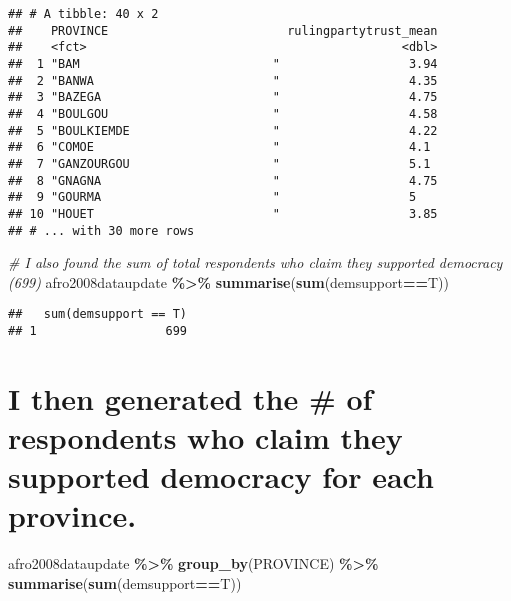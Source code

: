 \documentclass[]{article}
\newenvironment{Shaded}{\begin{snugshade}}{\end{snugshade}}
\newcommand{\CommentTok}[1]{\textcolor[rgb]{0.56,0.35,0.01}{\textit{#1}}}
\newcommand{\KeywordTok}[1]{\textcolor[rgb]{0.13,0.29,0.53}{\textbf{#1}}}
\newcommand{\NormalTok}[1]{#1}
\newcommand{\OperatorTok}[1]{\textcolor[rgb]{0.81,0.36,0.00}{\textbf{#1}}}
\newcommand{\StringTok}[1]{\textcolor[rgb]{0.31,0.60,0.02}{#1}}
\begin{document}
\begin{verbatim}
## # A tibble: 40 x 2
##    PROVINCE                         rulingpartytrust_mean
##    <fct>                                            <dbl>
##  1 "BAM                           "                  3.94
##  2 "BANWA                         "                  4.35
##  3 "BAZEGA                        "                  4.75
##  4 "BOULGOU                       "                  4.58
##  5 "BOULKIEMDE                    "                  4.22
##  6 "COMOE                         "                  4.1 
##  7 "GANZOURGOU                    "                  5.1 
##  8 "GNAGNA                        "                  4.75
##  9 "GOURMA                        "                  5   
## 10 "HOUET                         "                  3.85
## # ... with 30 more rows
\end{verbatim}

\begin{Shaded}
\begin{Highlighting}[]
\CommentTok{\# I also found the sum of total respondents who claim they supported democracy (699)}
\NormalTok{afro2008dataupdate }\OperatorTok{\%>\%}
\StringTok{  }\KeywordTok{summarise}\NormalTok{(}\KeywordTok{sum}\NormalTok{(demsupport}\OperatorTok{==}\NormalTok{T))}
\end{Highlighting}
\end{Shaded}

\begin{verbatim}
##   sum(demsupport == T)
## 1                  699
\end{verbatim}

\hypertarget{i-then-generated-the-of-respondents-who-claim-they-supported-democracy-for-each-province.}{%
\section{I then generated the \# of respondents who claim they supported
democracy for each
province.}\label{i-then-generated-the-of-respondents-who-claim-they-supported-democracy-for-each-province.}}

\begin{Shaded}
\begin{Highlighting}[]
\NormalTok{afro2008dataupdate }\OperatorTok{\%>\%}
\StringTok{  }\KeywordTok{group\_by}\NormalTok{(PROVINCE) }\OperatorTok{\%>\%}
\StringTok{  }\KeywordTok{summarise}\NormalTok{(}\KeywordTok{sum}\NormalTok{(demsupport}\OperatorTok{==}\NormalTok{T))}
\end{Highlighting}
\end{Shaded}
\end{document}
